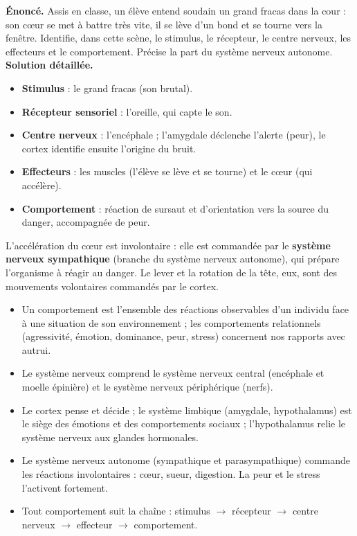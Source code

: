 \documentclass[11pt]{article}
\begin{document}
\begin{exoresolu}
\textbf{Énoncé.} Assis en classe, un élève entend soudain un grand fracas dans la cour : son cœur se met à battre très vite, il se lève d'un bond et se tourne vers la fenêtre. Identifie, dans cette scène, le stimulus, le récepteur, le centre nerveux, les effecteurs et le comportement. Précise la part du système nerveux autonome.
\tcblower
\textbf{Solution détaillée.}
\begin{itemize}
\item \textbf{Stimulus} : le grand fracas (son brutal).
\item \textbf{Récepteur sensoriel} : l'oreille, qui capte le son.
\item \textbf{Centre nerveux} : l'encéphale ; l'amygdale déclenche l'alerte (peur), le cortex identifie ensuite l'origine du bruit.
\item \textbf{Effecteurs} : les muscles (l'élève se lève et se tourne) et le cœur (qui accélère).
\item \textbf{Comportement} : réaction de sursaut et d'orientation vers la source du danger, accompagnée de peur.
\end{itemize}
L'accélération du cœur est involontaire : elle est commandée par le \textbf{système nerveux sympathique} (branche du système nerveux autonome), qui prépare l'organisme à réagir au danger. Le lever et la rotation de la tête, eux, sont des mouvements volontaires commandés par le cortex.
\end{exoresolu}

\begin{aretenir}
\begin{itemize}
\item Un comportement est l'ensemble des réactions observables d'un individu face à une situation de son environnement ; les comportements relationnels (agressivité, émotion, dominance, peur, stress) concernent nos rapports avec autrui.
\item Le système nerveux comprend le système nerveux central (encéphale et moelle épinière) et le système nerveux périphérique (nerfs).
\item Le cortex pense et décide ; le système limbique (amygdale, hypothalamus) est le siège des émotions et des comportements sociaux ; l'hypothalamus relie le système nerveux aux glandes hormonales.
\item Le système nerveux autonome (sympathique et parasympathique) commande les réactions involontaires : cœur, sueur, digestion. La peur et le stress l'activent fortement.
\item Tout comportement suit la chaîne : stimulus $\rightarrow$ récepteur $\rightarrow$ centre nerveux $\rightarrow$ effecteur $\rightarrow$ comportement.
\end{itemize}
\end{aretenir}
\end{document}

